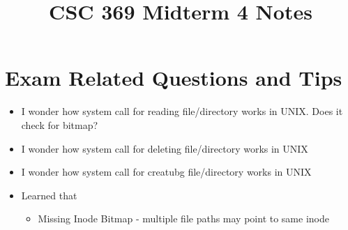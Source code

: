\documentclass[12pt]{article}
\begin{document}
\title{CSC 369 Midterm 4 Notes}

\section{Exam Related Questions and Tips}

\begin{itemize}
    \item I wonder how system call for reading file/directory works in UNIX. Does it check for bitmap?
    \item I wonder how system call for deleting file/directory works in UNIX
    \item I wonder how system call for creatubg file/directory works in UNIX
    \item Learned that
    \begin{itemize}
        \item Missing Inode Bitmap - multiple file paths may point to same inode
    \end{itemize}
\end{itemize}
\end{document}
